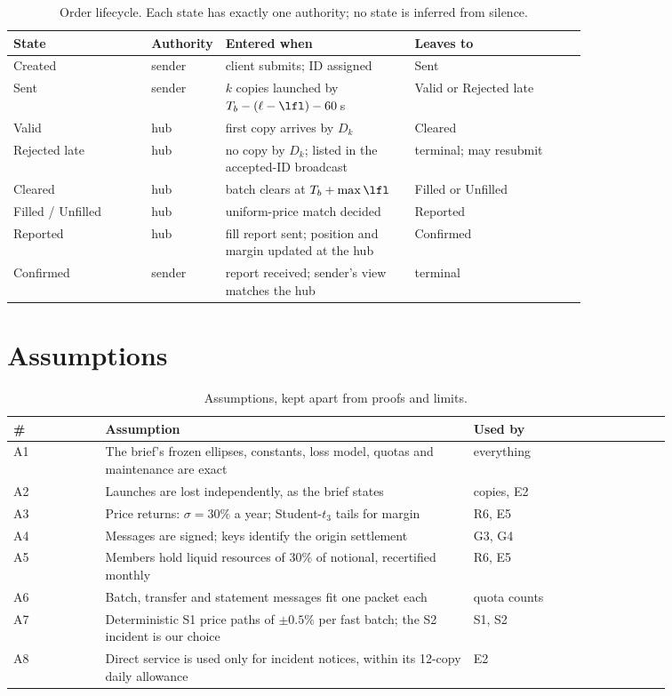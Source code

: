 \begin{table}[H]
\centering
\caption{Order lifecycle. Each state has exactly one authority; no state is inferred from silence.}\label{tab:life}
\small
\begin{tabular}{@{}lp{0.12\linewidth}p{0.33\linewidth}p{0.3\linewidth}@{}}
\toprule
State & Authority & Entered when & Leaves to \\
\midrule
Created & sender & client submits; ID assigned & Sent \\
Sent & sender & $k$ copies launched by $T_b-(\ell-\lfl)-60\,$s & Valid or Rejected late \\
Valid & hub & first copy arrives by $D_k$ & Cleared \\
Rejected late & hub & no copy by $D_k$; listed in the accepted-ID broadcast & terminal; may resubmit \\
Cleared & hub & batch clears at $T_b+\max\lfl$ & Filled or Unfilled \\
Filled / Unfilled & hub & uniform-price match decided & Reported \\
Reported & hub & fill report sent; position and margin updated at the hub & Confirmed \\
Confirmed & sender & report received; sender's view matches the hub & terminal \\
\bottomrule
\end{tabular}
\end{table}
\vspace{-6pt}
\section{Assumptions}\label{sec:assume}
\begin{table}[H]
\centering
\caption{Assumptions, kept apart from proofs and limits.}\label{tab:assume}
\small
\begin{tabular}{@{}lp{0.56\linewidth}p{0.3\linewidth}@{}}
\toprule
\# & Assumption & Used by \\
\midrule
A1 & The brief's frozen ellipses, constants, loss model, quotas and maintenance are exact & everything \\
A2 & Launches are lost independently, as the brief states & copies, E2 \\
A3 & Price returns: $\sigma=30\%$ a year; Student-$t_3$ tails for margin & R6, E5 \\
A4 & Messages are signed; keys identify the origin settlement & G3, G4 \\
A5 & Members hold liquid resources of $30\%$ of notional, recertified monthly & R6, E5 \\
A6 & Batch, transfer and statement messages fit one packet each & quota counts \\
A7 & Deterministic S1 price paths of $\pm0.5\%$ per fast batch; the S2 incident is our choice & S1, S2 \\
A8 & Direct service is used only for incident notices, within its 12-copy daily allowance & E2 \\
\bottomrule
\end{tabular}
\end{table}
\vspace{-6pt}
